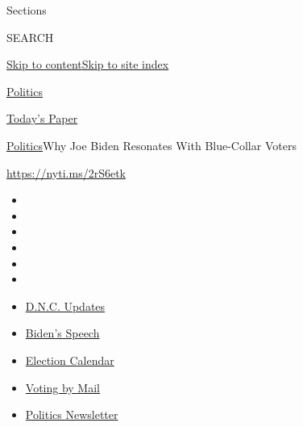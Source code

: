 Sections

SEARCH

\protect\hyperlink{site-content}{Skip to
content}\protect\hyperlink{site-index}{Skip to site index}

\href{https://www.nytimes3xbfgragh.onion/section/politics}{Politics}

\href{https://myaccount.nytimes3xbfgragh.onion/auth/login?response_type=cookie\&client_id=vi}{}

\href{https://www.nytimes3xbfgragh.onion/section/todayspaper}{Today's
Paper}

\href{/section/politics}{Politics}\textbar{}Why Joe Biden Resonates With
Blue-Collar Voters

\url{https://nyti.ms/2rS6etk}

\begin{itemize}
\item
\item
\item
\item
\item
\item
\end{itemize}

\begin{itemize}
\item
  \href{https://www.nytimes3xbfgragh.onion/live/2020/08/20/us/dnc-convention-election?action=click\&pgtype=Article\&state=default\&region=TOP_BANNER\&context=storylines_menu}{D.N.C.
  Updates}
\item
  \href{https://www.nytimes3xbfgragh.onion/2020/08/20/us/politics/biden-presidential-nomination-dnc.html?action=click\&pgtype=Article\&state=default\&region=TOP_BANNER\&context=storylines_menu}{Biden's
  Speech}
\item
  \href{https://www.nytimes3xbfgragh.onion/interactive/2019/us/elections/2020-presidential-election-calendar.html?action=click\&pgtype=Article\&state=default\&region=TOP_BANNER\&context=storylines_menu}{Election
  Calendar}
\item
  \href{https://www.nytimes3xbfgragh.onion/interactive/2020/08/11/us/politics/vote-by-mail-us-states.html?action=click\&pgtype=Article\&state=default\&region=TOP_BANNER\&context=storylines_menu}{Voting
  by Mail}
\item
  \href{https://www.nytimes3xbfgragh.onion/newsletters/politics?action=click\&pgtype=Article\&state=default\&region=TOP_BANNER\&context=storylines_menu}{Politics
  Newsletter}
\end{itemize}

